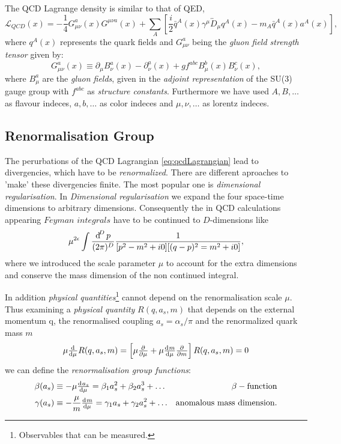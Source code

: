 \documentclass[../../index.tex]{subfiles}
\begin{document}
The QCD Lagrange density is similar to that of QED\cite{Jamin2006},
\begin{equation}
  \label{eq:qcdLagrangian}
  \mathcal{L}_{QCD}(x) = -\frac{1}{4}G_{\mu\nu}^a(x)G^{\mu\nu a}(x) + \sum_A \left[ \frac{i}{2} \bar{q}^A(x) \gamma^\mu \overleftrightarrow{D}_\mu q^A(x) - m_A\bar{q}^A(x) a^A(x) \right],
\end{equation}
where $q^A(x)$ represents the quark fields and $G_{\mu\nu}^a$ being the \textit{gluon field strength tensor} given by:
\begin{equation}
  \label{eq:gluonField}
  G_{\mu\nu}^a(x) \equiv \partial_\mu B_\nu^a(x) - \partial_\nu^a(x) + g f^{abc} B_\mu^b(x) B_\nu^c(x),
\end{equation}
where $B_\mu^a$ are the \textit{gluon fields}, given in the \textit{adjoint
  representation} of the SU(3) gauge group with $f^{abc}$ as \textit{structure
  constants}. Furthermore we have used $A, B, \dots$ as flavour indeces, $a,
b, \dots$ as color indeces and $\mu, \nu, \dots$ as lorentz indeces.


\subsection{Renormalisation Group}
The perurbations of the QCD Lagrangian \ref{eq:qcdLagrangian} lead to divergencies, which have to be
\textit{renormalized}. There are different aproaches to 'make' these
divergencies finite. The most popular one is \textit{dimensional
  regularisation}.
In \textit{Dimensional regularisation} we expand the four space-time dimensions
to arbitrary dimensions. Consequently the in QCD calculations appearing
$\textit{Feyman integrals}$ have to be continued to $D$-dimensions like
\begin{equation}
  \label{eq:dimRegFeynmanIntegral}
  \mu^{2\epsilon} \int \frac{\dif^D p}{(2\pi)^D}\frac{1}{[p^2-m^2+i0][(q-p)^2=m^2+i0]},
\end{equation}
where we introduced the scale parameter $\mu$ to account for the extra
dimensions and conserve the mass dimension of the non continued integral.

In addition \textit{physical quantities}\footnote{Observables that can be
  measured.} cannot depend on the renormalisation scale $\mu$. Thus examining a \textit{physical quantity} $R(q, a_s, m)$ that depends on the
external momentum q, the renormalised coupling $a_s=\alpha_s/\pi$ and the renormalized quark mass $m$ 
\begin{equation}
  \mu \od{}{\mu}R(q, a_s, m) = \left[ \mu \pd{}{\mu} + \mu \od{m}{\mu} \pd{}{m} \right] R(q, a_s, m) = 0
\end{equation}
we can define the \textit{renormalisation group functions}:
\begin{align}
  \beta(a_s) &\equiv -\mu \od{a_s}{\mu} = \beta_1 a_s^2 + \beta_2 a_s^3 + \dots & \beta-\text{function}
  \label{eq:betaFunction} \\
  \gamma(a_s) &\equiv - \frac{\mu}{m} \od{m}{\mu} = \gamma_1 a_s + \gamma_2 a_s^2 + \dots & \text{anomalous mass dimension}.
  \label{eq:anomalousMassDimension}
\end{align}
\end{document}
